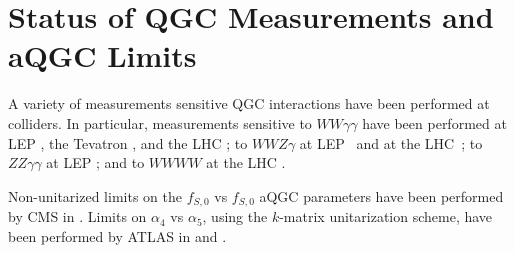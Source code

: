 \section{Status of QGC Measurements and aQGC Limits}
A variety of measurements sensitive QGC interactions have been
performed at colliders. In particular, measurements sensitive
to $WW\gamma\gamma$ have been performed 
at LEP \cite{Abdallah:2003xn,PhysRevD.70.032005}, 
the Tevatron \cite{PhysRevD.88.012005}, %
and the LHC \cite{PhysRevLett.115.031802,PhysRevD.90.032008,Chatrchyan:2013akv}; 
to $WWZ\gamma$ at LEP~\cite{Achard:2001eg,Abbiendi:1999aa,Abbiendi:2003jh}
and at the LHC~\cite{PhysRevD.90.032008};
to $ZZ\gamma\gamma$ at LEP \cite{Achard:2002iz,PhysRevD.70.032005}; 
and to $WWWW$ at the LHC \cite{PhysRevLett.113.141803,PhysRevLett.114.051801}. 


Non-unitarized limits on the $f_{S,0}$ vs $f_{S,0}$ aQGC 
parameters have been performed by CMS in \cite{khachatryan:1957133}.
Limits on $\alpha_4$ vs $\alpha_5$, using the $k$-matrix unitarization
scheme, have been performed by ATLAS 
in \cite{PhysRevLett.113.141803} and \cite{Aad:2016ett}.
